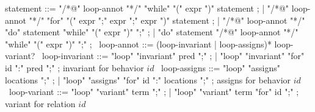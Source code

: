 \begin{syntax}
  statement ::= "/*@" loop-annot "*/" "while" "(" expr ")" statement ;
  | "/*@" loop-annot "*/" "for" "(" expr ";" expr ";" expr ")" statement ;
  | "/*@" loop-annot "*/" "do" statement "while" "(" expr ")" ";" ;
  | "do" statement "/*@" loop-annot "*/" "while" "(" expr ")" ";" ; \experimental
  \
  loop-annot ::= (loop-invariant | loop-assigns)* loop-variant?
  \
  loop-invariant ::= "loop" "invariant" pred ";" ;
  | "loop" "invariant" "for" id ":" pred ";" ; invariant for behavior $id$
  \
  loop-assigns ::= "loop" "assigns" locations ";" ;
  | "loop" "assigns" "for" id ":" locations ";" ; assigns for behavior $id$
  \
  loop-variant ::= "loop" "variant" term ";" ;
  | "loop" "variant" term "for" id ";" ; variant for relation $id$
  \
\end{syntax}
